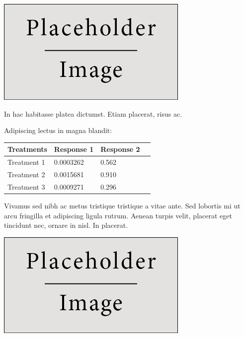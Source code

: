 \documentclass[a0,portrait]{a0poster}
\begin{document}
\begin{multicols}{2}
\begin{center}\vspace{1cm}
\includegraphics[width=0.8\linewidth]{placeholder}
\end{center}\vspace{1cm}

In hac habitasse platea dictumst. Etiam placerat, risus ac.

Adipiscing lectus in magna blandit:

\begin{center}\vspace{1cm}
\begin{tabular}{l l l l}
\toprule
\textbf{Treatments} & \textbf{Response 1} & \textbf{Response 2} \\
\midrule
Treatment 1 & 0.0003262 & 0.562 \\
Treatment 2 & 0.0015681 & 0.910 \\
Treatment 3 & 0.0009271 & 0.296 \\
\bottomrule
\end{tabular}
\end{center}\vspace{1cm}

Vivamus sed nibh ac metus tristique tristique a vitae ante. Sed lobortis mi ut arcu fringilla et adipiscing ligula rutrum. Aenean turpis velit, placerat eget tincidunt nec, ornare in nisl. In placerat.

\begin{center}\vspace{1cm}
\includegraphics[width=0.8\linewidth]{placeholder}
\end{center}\vspace{1cm}


\end{multicols}
\end{document}
